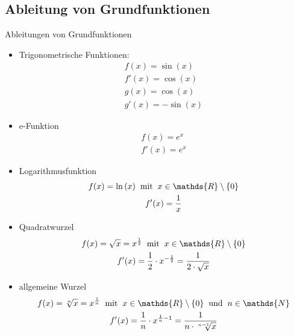 \subsection{Ableitung von Grundfunktionen}
\begin{merke}{Ableitungen von Grundfunktionen}{}
\begin{itemize}
 \item Trigonometrische Funktionen:
    \begin{gather*} 
	f(x) = \sin({x})  \\
	f'(x) = \cos({x})\\
 g(x) = \cos{(x)}\\
 g'(x) = -\sin{(x)}	\end{gather*}
\item e-Funktion
\begin{gather*} 
	f(x) = e^x  \\
	f'(x) = e^x
	\end{gather*}
 \item Logarithmusfunktion
 \begin{gather*} 
	f(x) = \ln{(x)}   \hspace{0.2cm} \text{mit} \hspace{0.2cm} x\in \mathds{R}\setminus \{0\}\\
	f'(x) = \dfrac{1}{x}
	\end{gather*}
 \item Quadratwurzel
 \begin{gather*} 
	f(x) = \sqrt{x} = x^{\frac{1}{2}}   \hspace{0.2cm} \text{mit} \hspace{0.2cm} x\in \mathds{R}\setminus \{0\} \\
 f'(x) = \dfrac{1}{2} \cdot x^{-\frac{1}{2} }= \dfrac{1}{2\cdot \sqrt{x}} 
 \end{gather*}
  \item allgemeine Wurzel
 \begin{gather*} 
	f(x) = \sqrt[n]{x} = x^{\frac{1}{n}}   \hspace{0.2cm} \text{mit} \hspace{0.2cm} x\in \mathds{R}\setminus \{0\}  \hspace{0.2cm} \text{und} \hspace{0.2cm} n\in \mathds{N} \\
 f'(x) = \dfrac{1}{n} \cdot x^{ \frac{1}{n} - 1}= \dfrac{1}{n\cdot \sqrt[n-1]{x}} 
 \end{gather*}
\end{itemize}
\end{merke}
